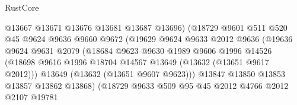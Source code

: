 \begin{lexlean}{RustCore}
\begin{coremodule}
                                    @13667
                                    @13671
                                    @13676
                                    @13681
                                    @13687
                                    @13696)
                                  (@18729
                                    @9601
                                    @511
                                    @520
                                    @45
                                    @9624
                                    @9636
                                    @9660
                                    @9672
                                    (@19629
                                      @9624
                                      @9633
                                      @2012
                                      @9636
                                      (@19636
                                        @9624
                                        @9631
                                        @2079
                                        (@18684
                                          @9623
                                          @9630
                                          @1989
                                          @9606
                                          @1996
                                          @14526
                                          (@18698
                                            @9616
                                            @1996
                                            @18704
                                            @14567
                                            @13649
                                            (@13632 (@13651 @9617 @2012)))
                                          @13649
                                          (@13632 (@13651 @9607 @9623)))
                                        @13847
                                        @13850
                                        @13853
                                        @13857
                                        @13862
                                        @13868)
                                      (@18729
                                        @9633
                                        @509
                                        @95
                                        @45
                                        @2012
                                        @4766
                                        @2012
                                        @2107
                                        @19781

\end{coremodule}
\end{lexlean}
